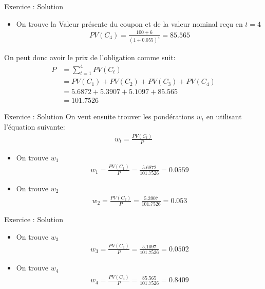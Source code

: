 \documentclass[10pt,a4paper]{beamer}
\begin{document}
\begin{frame}{Exercice : Solution}
\begin{itemize}[label=\bullet]
\item On trouve la Valeur présente du coupon et de la valeur nominal reçu en $t=4$
\begin{align*}
PV(C_4)=\frac{100+6}{(1+0.055)^4}=85.565  
\end{align*}
\end{itemize}
On peut donc avoir le prix de l'obligation comme suit:
\begin{align*}
P&=\sum_{t=1}^4 PV(C_t)\\
&=PV(C_1)+PV(C_2)+PV(C_3)+PV(C_4) \\
&= 5.6872 + 5.3907+5.1097+85.565 \\
&=101.7526
\end{align*}
\end{frame}
\begin{frame}{Exercice : Solution}
On veut ensuite trouver les pondérations $w_t$ en utilisant l'équation suivante: 
\begin{align*}
w_t=\frac{PV(C_t)}{P}
\end{align*}
\begin{itemize}[label=\bullet]
\item On trouve $w_1$
\begin{align*}
w_1=\frac{PV(C_1)}{P}=\frac{5.6872 }{101.7526}=0.0559                           
\end{align*} 
\item On trouve $w_2$
\begin{align*}
w_2=\frac{PV(C_2)}{P}=\frac{5.3907}{101.7526}=0.053                                          
\end{align*} 
\end{itemize}
\end{frame}
\begin{frame}{Exercice : Solution}
\begin{itemize}[label=\bullet]
\item On trouve $w_3$
\begin{align*}
w_3=\frac{PV(C_3)}{P}=\frac{5.1097 }{101.7526}=0.0502                                             
\end{align*} 
\item On trouve $w_4$
\begin{align*}
w_4=\frac{PV(C_4)}{P}=\frac{85.565}{101.7526}=0.8409                                                     
\end{align*} 
\end{itemize}
\end{frame}
\end{document}
